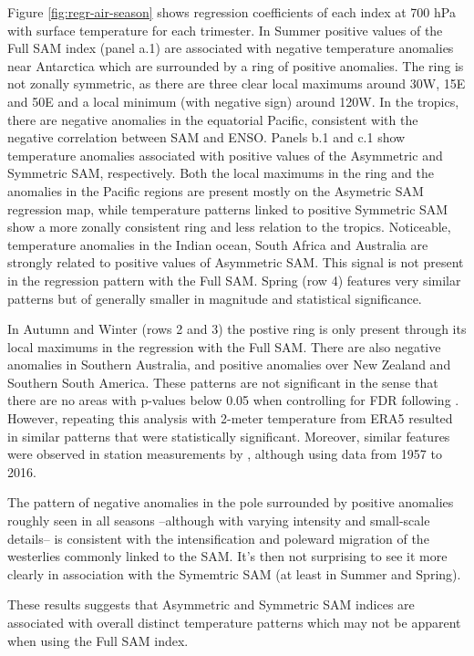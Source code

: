 \documentclass[twocol]{ametsocV5}
\begin{document}
Figure \ref{fig:regr-air-season} shows regression coefficients of each
index at 700 hPa with surface temperature for each trimester. In Summer
positive values of the Full SAM index (panel a.1) are associated with
negative temperature anomalies near Antarctica which are surrounded by a
ring of positive anomalies. The ring is not zonally symmetric, as there
are three clear local maximums around 30\degree W, 15\degree E and
50\degree E and a local minimum (with negative sign) around
120\degree W. In the tropics, there are negative anomalies in the
equatorial Pacific, consistent with the negative correlation between SAM
and ENSO. Panels b.1 and c.1 show temperature anomalies associated with
positive values of the Asymmetric and Symmetric SAM, respectively. Both
the local maximums in the ring and the anomalies in the Pacific regions
are present mostly on the Asymetric SAM regression map, while
temperature patterns linked to positive Symmetric SAM show a more
zonally consistent ring and less relation to the tropics. Noticeable,
temperature anomalies in the Indian ocean, South Africa and Australia
are strongly related to positive values of Asymmetric SAM. This signal
is not present in the regression pattern with the Full SAM. Spring (row
4) features very similar patterns but of generally smaller in magnitude
and statistical significance.

In Autumn and Winter (rows 2 and 3) the postive ring is only present
through its local maximums in the regression with the Full SAM. There
are also negative anomalies in Southern Australia, and positive
anomalies over New Zealand and Southern South America. These patterns
are not significant in the sense that there are no areas with p-values
below 0.05 when controlling for FDR following \citet{wilks2016}.
However, repeating this analysis with 2-meter temperature from ERA5
resulted in similar patterns that were statistically significant.
Moreover, similar features were observed in station measurements by
\citet{jones2019}, although using data from 1957 to 2016.

The pattern of negative anomalies in the pole surrounded by positive
anomalies roughly seen in all seasons --although with varying intensity
and small-scale details-- is consistent with the intensification and
poleward migration of the westerlies commonly linked to the SAM. It's
then not surprising to see it more clearly in association with the
Symemtric SAM (at least in Summer and Spring).

These results suggests that Asymmetric and Symmetric SAM indices are
associated with overall distinct temperature patterns which may not be
apparent when using the Full SAM index.
\end{document}
